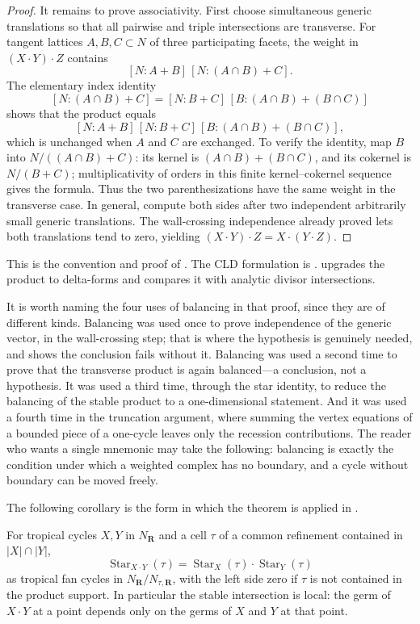 \begin{proof}
It remains to prove associativity.  First choose simultaneous generic
translations so that all pairwise and triple intersections are transverse.
For tangent lattices $A,B,C\subset N$ of three participating facets, the
weight in $(X\cdot Y)\cdot Z$ contains
\[
 [N:A+B]\,[N:(A\cap B)+C].
\]
The elementary index identity
\[
 [N:(A\cap B)+C]
 =[N:B+C]\,[B:(A\cap B)+(B\cap C)]
\]
shows that the product equals
\[
 [N:A+B]\,[N:B+C]\,
 [B:(A\cap B)+(B\cap C)],
\]
which is unchanged when $A$ and $C$ are exchanged.  To verify the identity,
map $B$ into $N/((A\cap B)+C)$: its kernel is
$(A\cap B)+(B\cap C)$, and its cokernel is $N/(B+C)$; multiplicativity of
orders in this finite kernel--cokernel sequence gives the formula.
Thus the two parenthesizations have the same weight in the transverse case.
In general, compute both sides after two independent arbitrarily small
generic translations.  The wall-crossing independence already proved lets
both translations tend to zero, yielding
$(X\cdot Y)\cdot Z=X\cdot(Y\cdot Z)$.
\end{proof}

This is the convention and proof of
\cite[Propositions~4.3.6--4.3.7]{MR18Tropical}.  The CLD formulation is
\cite[\S6]{CLD25}.  upgrades the product to
delta-forms and compares it with analytic divisor intersections.

It is worth naming the four uses of balancing in that proof, since they are
of different kinds.  Balancing was used once to prove independence of the
generic vector, in the wall-crossing step; that is where the hypothesis is
genuinely needed, and  shows the conclusion fails
without it.  Balancing was used a second time to prove that the transverse
product is again balanced---a conclusion, not a hypothesis.  It was used a
third time, through the star identity, to reduce the balancing of the stable
product to a one-dimensional statement.  And it was used a fourth time in the
truncation argument, where summing the vertex equations of a bounded piece of
a one-cycle leaves only the recession contributions.  The reader who wants a
single mnemonic may take the following: balancing is exactly the condition
under which a weighted complex has no boundary, and a cycle without boundary
can be moved freely.

The following corollary is the form in which the theorem is applied in
.

\begin{corollary}
\label{cor:ch10-stable-star}
For tropical cycles $X,Y$ in $N_{\mathbf R}$ and a cell $\tau$ of a common
refinement contained in $|X|\cap|Y|$,
\[
 \operatorname{Star}_{X\cdot Y}(\tau)
 =\operatorname{Star}_X(\tau)\cdot\operatorname{Star}_Y(\tau)
\]
as tropical fan cycles in $N_{\mathbf R}/N_{\tau,\mathbf R}$, with the left
side zero if $\tau$ is not contained in the product support. In particular
the stable intersection is local: the germ of $X\cdot Y$ at a point depends
only on the germs of $X$ and $Y$ at that point.
\end{corollary}

